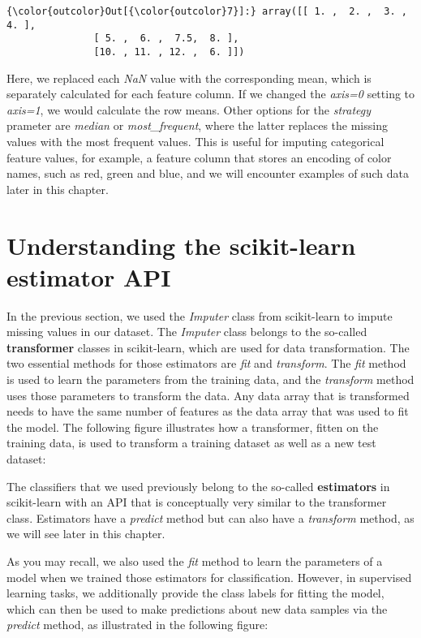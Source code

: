 \documentclass[11pt]{article}
\begin{document}
\begin{Verbatim}[commandchars=\\\{\}]
{\color{outcolor}Out[{\color{outcolor}7}]:} array([[ 1. ,  2. ,  3. ,  4. ],
               [ 5. ,  6. ,  7.5,  8. ],
               [10. , 11. , 12. ,  6. ]])
\end{Verbatim}
            
    Here, we replaced each \emph{NaN} value with the corresponding mean,
which is separately calculated for each feature column. If we changed
the \emph{axis=0} setting to \emph{axis=1}, we would calculate the row
means. Other options for the \emph{strategy} prameter are \emph{median}
or \emph{most\_frequent}, where the latter replaces the missing values
with the most frequent values. This is useful for imputing categorical
feature values, for example, a feature column that stores an encoding of
color names, such as red, green and blue, and we will encounter examples
of such data later in this chapter.

    \section{Understanding the scikit-learn estimator
API}\label{understanding-the-scikit-learn-estimator-api}

    In the previous section, we used the \emph{Imputer} class from
scikit-learn to impute missing values in our dataset. The \emph{Imputer}
class belongs to the so-called \textbf{transformer} classes in
scikit-learn, which are used for data transformation. The two essential
methods for those estimators are \emph{fit} and \emph{transform}. The
\emph{fit} method is used to learn the parameters from the training
data, and the \emph{transform} method uses those parameters to transform
the data. Any data array that is transformed needs to have the same
number of features as the data array that was used to fit the model. The
following figure illustrates how a transformer, fitten on the training
data, is used to transform a training dataset as well as a new test
dataset:

    The classifiers that we used previously belong to the so-called
\textbf{estimators} in scikit-learn with an API that is conceptually
very similar to the transformer class. Estimators have a \emph{predict}
method but can also have a \emph{transform} method, as we will see later
in this chapter.

As you may recall, we also used the \emph{fit} method to learn the
parameters of a model when we trained those estimators for
classification. However, in supervised learning tasks, we additionally
provide the class labels for fitting the model, which can then be used
to make predictions about new data samples via the \emph{predict}
method, as illustrated in the following figure:
\end{document}
